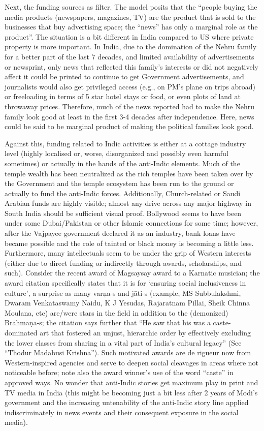 Next, the funding sources as filter. The model posits that the “people buying the media products (newspapers, magazines, TV) are the product that is sold to the businesses that buy advertising space; the “news” has only a marginal role as the product”. The situation is a bit different in India compared to US where private property is more important.  In India, due to the domination of the Nehru family for a better part of the last 7 decades, and limited availability of advertisements or newsprint, only news that reflected this family’s interests or did not negatively affect it could be printed to continue to get Government advertisements, and journalists would also get privileged access (e.g., on PM’s plane on trips abroad) or freeloading in terms of 5 star hotel stays or food, or even plots of land at throwaway prices. Therefore, much of the news reported had to make the Nehru family look good at least in the first 3-4 decades after independence. Here, news could be said to be marginal product of making the political families look good.

Against this, funding related to Indic activities is either at a cottage industry level (highly localised or, worse, disorganized and possibly even harmful sometimes) or actually in the hands of the anti-Indic elements. Much of the temple wealth has been neutralized as the rich temples have been taken over by the Government and the temple ecosystem has been run to the ground or actually to fund the anti-Indic forces. Additionally, Church-related or Saudi Arabian funds are highly visible; almost any drive across any major highway in South India should be sufficient visual proof.  Bollywood seems to have been under some Dubai/Pakistan or other Islamic connections for some time; however, after the Vajpayee government declared it as an industry, bank loans have became possible and the role of tainted or black money is becoming a little less.  Furthermore, many intellectuals seem to be under the grip of Western interests (either due to direct funding or indirectly through awards, scholarships, and such). Consider the recent award of Magsaysay award to a Karnatic musician; the award citation specifically states that it is for ‘ensuring social inclusiveness in culture’, a surprise as many varṇa-s and jāti-s (example, MS Subbulakshmi, Dwaram Venkataswamy Naidu, K J Yesudas, Rajaratnam Pillai, Sheik Chinna Moulana, etc) are/were stars in the field in addition to the (demonized) Brāhmaṇa-s; the citation says further that “He saw that his was a caste-dominated art that fostered an unjust, hierarchic order by effectively excluding the lower classes from sharing in a vital part of India’s cultural legacy” (See “Thodur Madabusi Krishna”). Such motivated awards are de rigueur now from Western-inspired agencies and serve to deepen social cleavages in areas where not noticeable before; note also the award winner’s use of the word “caste” in approved ways. No wonder that anti-Indic stories get maximum play in print and TV media in India (this might be becoming just a bit less after 2 years of Modi’s government and the increasing untenability of the anti-Indic story line applied indiscriminately in news events and their consequent exposure in the social media).

